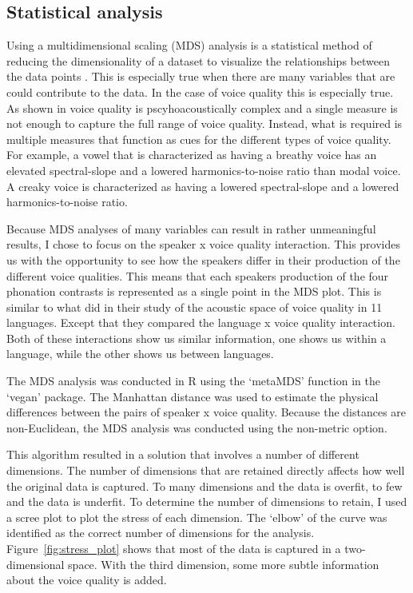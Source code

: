 \subsection{Statistical analysis} \label{sec:acousticlandscape:statistics}

Using a multidimensional scaling (MDS) analysis is a statistical method of reducing the dimensionality of a dataset to visualize the relationships between the data points \citep{b.kruskalMultidimensionalScaling1978}. This is especially true when there are many variables that are could contribute to the data. In the case of voice quality this is especially true. As shown in \citet{kreimanUnifiedTheoryVoice2014,kreimanValidatingPsychoacousticModel2021,garellekAcousticDiscriminabilityComplex2020} voice quality is pscyhoacoustically complex and a single measure is not enough to capture the full range of voice quality. Instead, what is required is multiple measures that function as cues for the different types of voice quality. For example, a vowel that is characterized as having a breathy voice has an elevated spectral-slope and a lowered harmonics-to-noise ratio than modal voice. A creaky voice is characterized as having a lowered spectral-slope and a lowered harmonics-to-noise ratio. 

Because MDS analyses of many variables can result in rather unmeaningful results, I chose to focus on the speaker x voice quality interaction. This provides us with the opportunity to see how the speakers differ in their production of the different voice qualities. This means that each speakers production of the four phonation contrasts is represented as a single point in the MDS plot. This is similar to what \citet{keatingCrosslanguageAcousticSpace2023} did in their study of the acoustic space of voice quality in 11 languages. Except that they compared the language x voice quality interaction. Both of these interactions show us similar information, one shows us within a language, while the other shows us between languages.

The MDS analysis was conducted in R using the  `metaMDS' function in the `vegan' package. The Manhattan distance was used to estimate the physical differences between the pairs of speaker x voice quality. Because the distances are non-Euclidean, the MDS analysis was conducted using the non-metric option. 

This algorithm resulted in a solution that involves a number of different dimensions. The number of dimensions that are retained directly affects how well the original data is captured. To many dimensions and the data is overfit, to few and the data is underfit. To determine the number of dimensions to retain, I used a scree plot to plot the stress of each dimension. The `elbow' of the curve was identified as the correct number of dimensions for the analysis. Figure~\ref{fig:stress_plot} shows that most of the data is captured in a two-dimensional space. With the third dimension, some more subtle information about the voice quality is added.

